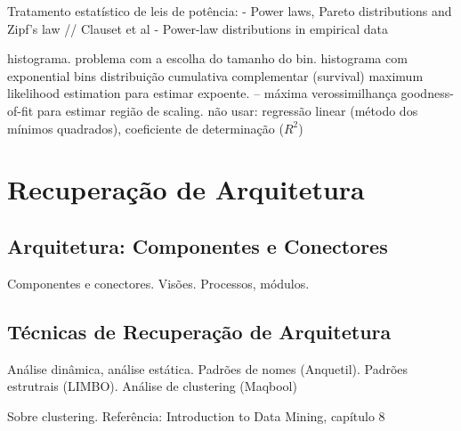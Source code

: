 \documentclass{article}
\begin{document}
Tratamento estatístico de leis de potência:  \cite{Newman2005} - Power laws, Pareto distributions and Zipf's law   //   Clauset et al - Power-law distributions in empirical data \cite{Clauset2007}

histograma. problema com a escolha do tamanho do bin. histograma com exponential bins
distribuição cumulativa complementar (survival)
maximum likelihood estimation para estimar expoente. -- máxima verossimilhança
goodness-of-fit para estimar região de scaling.
não usar: regressão linear (método dos mínimos quadrados), coeficiente de determinação ($R^2$)






\section{Recuperação de Arquitetura}

\subsection{Arquitetura: Componentes e Conectores}

Componentes e conectores.
Visões. Processos, módulos.

\subsection{Técnicas de Recuperação de Arquitetura}


Análise dinâmica, análise estática. Padrões de nomes (Anquetil). Padrões estrutrais (LIMBO). Análise de clustering (Maqbool)



Sobre clustering. Referência: Introduction to Data Mining, capítulo 8
\end{document}
